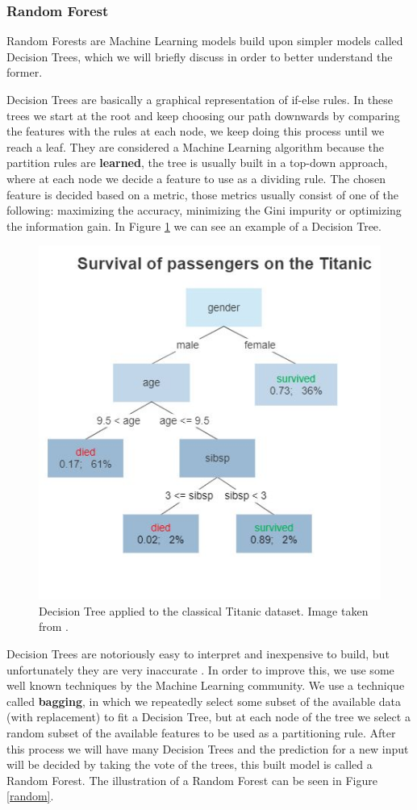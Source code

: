 \subsubsection{Random Forest}

Random Forests are Machine Learning models build upon simpler models called Decision Trees, which we will briefly discuss in order to better understand the former. 

Decision Trees are basically a graphical representation of if-else rules. In these trees we start at the root and keep choosing our path downwards by comparing the features with the rules at each node, we keep doing this process until we reach a leaf. They are considered a Machine Learning algorithm because the partition rules are \textbf{learned}, the tree is usually built in a top-down approach, where at each node we decide a feature to use as a dividing rule. The chosen feature is decided based on a metric, those metrics usually consist of one of the following: maximizing the accuracy, minimizing the Gini impurity or optimizing the information gain. In Figure \ref{decision} we can see an example of a Decision Tree.

\begin{figure}[H]
    \includegraphics[width=.7\textwidth]{Cap2-Methods/Decision_Tree.jpg}
    \centering
	\caption{Decision Tree applied to the classical Titanic dataset. Image taken from \cite{decisionimg}.}
	\label{decision}
\end{figure}

Decision Trees are notoriously easy to interpret and inexpensive to build, but unfortunately they are very inaccurate \cite{elements}. In order to improve this, we use some well known techniques by the Machine Learning community. We use a technique called \textbf{bagging}, in which we repeatedly select some subset of the available data (with replacement) to fit a Decision Tree, but at each node of the tree we select a random subset of the available features to be used as a partitioning rule. After this process we will have many Decision Trees and the prediction for a new input will be decided by taking the vote of the trees, this built model is called a Random Forest. The illustration of a Random Forest can be seen in Figure \ref{random}. 

